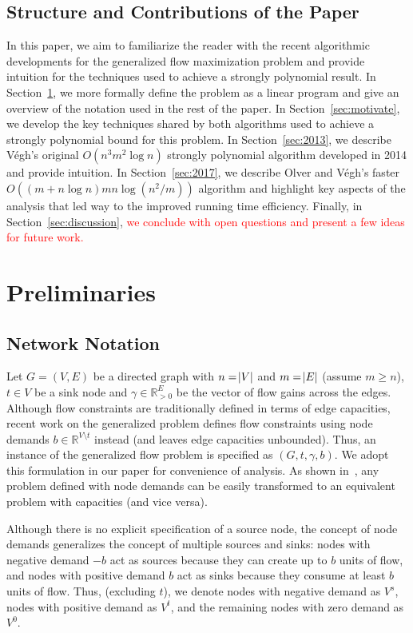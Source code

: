 \documentclass[11pt]{article}
\theoremstyle{definition}
\theoremstyle{definition}
\theoremstyle{definition}
\newcommand{\R}{\mathbb{R}}
\newcommand{\vsrc}{V^{s}}
\newcommand{\vsink}{V^{t}}
\newcommand{\vz}{V^{0}}
\newcommand{\rewrite}[1]{\textcolor{red}{#1}}
\begin{document}
	\subsection{Structure and Contributions of the Paper}\label{sec:structure}
	In this paper, we aim to
	familiarize the reader with the recent algorithmic developments for the
	generalized flow maximization problem and provide intuition for the techniques
	used to achieve a strongly polynomial result. In Section~\ref{sec:prelim}, we more formally
	define the problem as a linear program and give an overview of the notation
	used in the rest of the paper. In Section~\ref{sec:motivate}, we develop the key techniques
	shared by both algorithms used to achieve a strongly polynomial bound for this
	problem. In Section~\ref{sec:2013}, we describe Végh's original $O(n^3m^2 \log n)$ strongly
	polynomial algorithm developed in 2014 and provide intuition. In Section~\ref{sec:2017}, we describe Olver and
	Végh's faster $O((m + n\log n)mn\log(n^2 / m))$ algorithm and highlight key
	aspects of the analysis that led way to the improved running time efficiency.
	Finally, in Section~\ref{sec:discussion}, 
    \rewrite{we conclude with open questions and present a few ideas
	for future work.}
    
\section{Preliminaries}\label{sec:prelim}

	\subsection{Network Notation}\label{sec:notation}
	Let $G=(V,E)$ be a directed graph with $n=\abs{V}$ and $m=\abs{E}$ (assume
	$m \geq n$), $t \in V$ be a sink node and $\gamma \in \R_{>0}^E$ be the vector of flow gains
	across the edges. Although flow constraints are traditionally defined in terms of
	edge capacities, recent work on the generalized problem defines flow
	constraints using node demands $b \in \R^{V \setminus t}$ instead (and leaves
	edge capacities unbounded). Thus, an instance of the generalized flow problem
	is specified as $(G, t, \gamma, b)$.
	We adopt this formulation in our paper for
	convenience of analysis. As shown in~\cite{Vegh2013}, any problem defined with
	node demands can be easily transformed to an equivalent problem with
	capacities (and vice versa). 

	Although there is no explicit specification of a source node, the concept of
	node demands generalizes the concept of multiple sources and
	sinks: nodes with negative demand $-b$ act as sources because they can create
	up to $b$ units of flow, and nodes with positive demand $b$ act as sinks 
	because they consume at least $b$ units of flow. 
	Thus, (excluding $t$), we denote
	nodes with negative demand as $\vsrc$, nodes with positive
	demand as $\vsink$, and the remaining nodes with zero demand as $\vz$.
\end{document}
